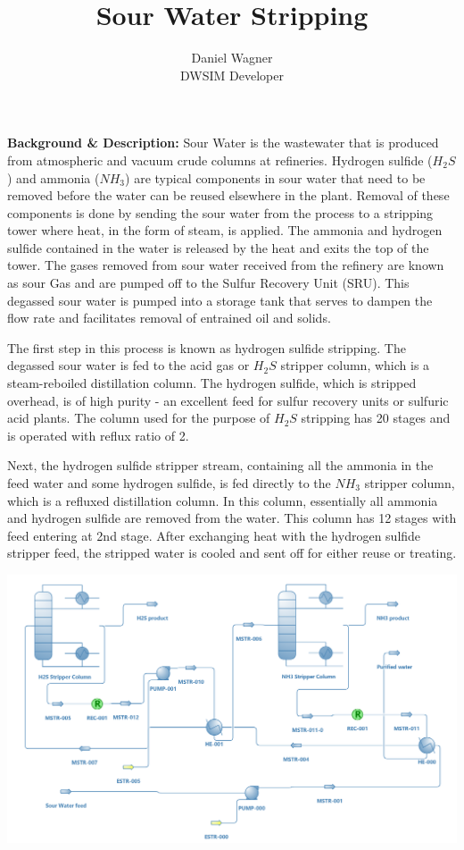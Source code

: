 \documentclass[a4paper,12pt]{article}
\title{Sour Water Stripping}
\author{Daniel Wagner \\ DWSIM Developer}
\date{}
\begin{document}
\maketitle

\noindent \textbf{Background \& Description:}
\newline Sour Water is the wastewater that is produced from atmospheric and vacuum crude columns at refineries. Hydrogen sulfide ($H_2S$) and ammonia ($NH_3$) are typical components in sour water that need to be removed before the water can be reused elsewhere in the plant. Removal of these components is done by sending the sour water from the process to a stripping tower where heat, in the form of steam, is applied. The ammonia and hydrogen sulfide contained in the water is released by the heat and exits the top of the tower.
The gases removed from sour water received from the refinery are known as sour Gas and are pumped off to the Sulfur Recovery Unit (SRU). This degassed sour water is pumped into a storage tank that serves to dampen the flow rate and facilitates removal of entrained oil and solids.


The first step in this process is known as hydrogen sulfide stripping. The degassed sour water is fed to the acid gas or $H_2S$ stripper column, which is a steam-reboiled distillation column. The hydrogen sulfide, which is stripped overhead, is of high purity - an excellent feed for sulfur recovery units or sulfuric acid plants. The column used for the purpose of $H_2S$ stripping has 20 stages and is operated with reflux ratio of 2.


Next, the hydrogen sulfide stripper stream, containing all the ammonia in the feed water and some hydrogen sulfide, is fed directly to the $NH_3$ stripper column, which is a refluxed distillation column. In this column, essentially all ammonia and hydrogen sulfide are removed from the water. This column has 12 stages with feed entering at 2nd stage. After exchanging heat with the hydrogen sulfide stripper feed, the stripped water is cooled and sent off for either reuse or treating.


\vspace{10mm}
\centerline{\includegraphics[width=0.85\linewidth]{Sour-Water.png}}
\end{document}
